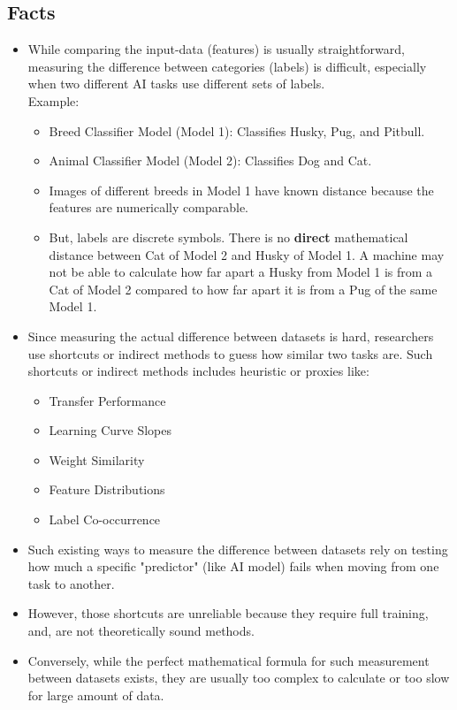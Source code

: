 \documentclass[11pt, a4paper]{article}
\theoremstyle{plain} %
\theoremstyle{definition} %
\begin{document}
		\subsection{Facts}
		\label{sec:facts}
			\begin{itemize}
				\item While comparing the input-data (features) is usually straightforward, measuring the difference between categories (labels) is difficult, especially when two different AI tasks use different sets of labels.\\
				Example:
				\begin{itemize}
					\item Breed Classifier Model (Model 1): Classifies Husky, Pug, and Pitbull.
					\item Animal Classifier Model (Model 2): Classifies Dog and Cat.
					\item Images of different breeds in Model 1 have known distance because the features are numerically comparable.
					\item But, labels are discrete symbols. There is no \textbf{direct} mathematical distance between Cat of Model 2 and Husky of Model 1. A machine may not be able to calculate how far apart a Husky from Model 1 is from a Cat of Model 2 compared to how far apart it is from a Pug of the same Model 1.
				\end{itemize}
				\item Since measuring the actual difference between datasets is hard, researchers use shortcuts or indirect methods to guess how similar two tasks are. Such shortcuts or indirect methods includes heuristic or proxies like:
				\begin{itemize}
					\item Transfer Performance
					\item Learning Curve Slopes
					\item Weight Similarity
					\item Feature Distributions
					\item Label Co-occurrence
				\end{itemize}
				\item Such existing ways to measure the difference between datasets rely on testing how much a specific "predictor" (like AI model) fails when moving from one task to another.
				\item However, those shortcuts are unreliable because they require full training, and, are not theoretically sound methods.
				\item Conversely, while the perfect mathematical formula for such measurement between datasets exists, they are usually too complex to calculate or too slow for large amount of data.

\end{itemize}
\end{document}
